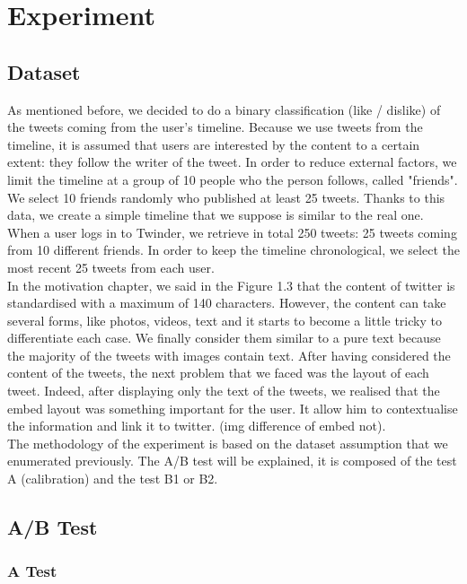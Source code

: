 \section{Experiment}

\subsection{Dataset}

As mentioned before, we decided to do a binary classification (like / dislike) of the tweets coming from the 
user's timeline. Because we use tweets from the timeline, it is assumed that users are interested by the 
content to a certain extent: they follow the writer of the tweet. In order to reduce external factors, we limit the 
timeline at a group of 10 people who the person follows, called "friends". We select 10 friends randomly who 
published at least 25 tweets. Thanks to this data, we create a simple timeline that we suppose is similar to the 
real one. When a user logs in to Twinder, we retrieve in total 250 tweets: 25 tweets coming from 10 different 
friends. In order to keep the timeline chronological, we select the most recent 25 tweets from each user. \\
In the motivation chapter, we said in the Figure 1.3 that the content of twitter is standardised with a maximum of 140 characters. However, the content can take several forms, like photos, videos, text and it starts to become a little tricky to differentiate each case. We finally consider them similar to a pure text because the majority of the tweets with images contain text. After having considered the content of the tweets, the next problem that we faced was the layout of each tweet. Indeed, after displaying only the text of the tweets, we realised that the embed layout was something important for the user. It allow him to contextualise the information and link it to twitter. (img difference of embed not). \\
The methodology of the experiment is based on the dataset assumption that we enumerated previously. The 
A/B test will be explained, it is composed of the test A (calibration) and the test B1 or B2.  

\subsection{A/B Test}

\subsubsection{A Test}






